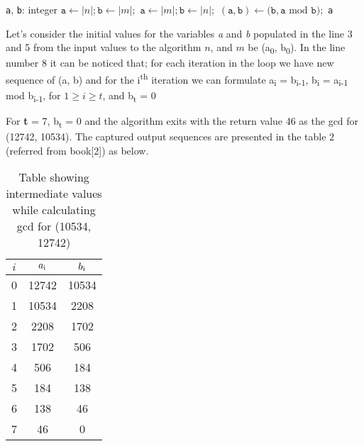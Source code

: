 \documentclass[conference,compsoc]{IEEEtran}
\newcommand{\var}[1]{\textit{#1}}
\newcommand{\progvar}[1]{\texttt{#1}}
\renewcommand{\mod}{\text{mod}}
\begin{document}

\begin{algorithmic}[1]
\STATE \progvar{a}, \progvar{b}: integer
	\STATE $\progvar{a} \gets |n|; \progvar{b} \gets |m|;$
\ELSE
	\STATE $\progvar{a} \gets |m|; \progvar{b} \gets |n|;$
\ENDIF
\WHILE{$\progvar{b} > 0$ } 
	\STATE $(\progvar{a}, \progvar{b}) \leftarrow (\progvar{b}, \progvar{a}  $ $\mod $ $\progvar{b});$
\ENDWHILE
\RETURN \progvar{a}
\end {algorithmic}

Let's consider the initial values for the variables \var{a} and \var{b} populated in the line 3 and 5 from the input values to the algorithm $n$, and $m$ be (a\textsubscript{0}, b\textsubscript{0}). In the line number 8 it can be noticed that; for each iteration in the loop we have new sequence of (a, b) and for the i\textsuperscript{th} iteration we can formulate a\textsubscript{i} = b\textsubscript{i-1}, b\textsubscript{i} = a\textsubscript{i-1} mod b\textsubscript{i-1}, for $1 \geq i \geq t$, and b\textsubscript{t} = 0

For \textbf{t} = 7, b\textsubscript{t} = 0 and the algorithm exits with the return value 
46 as the gcd for (12742, 10534). The captured output sequences are presented in the table 2 (referred from book[2]) as below.
\begin{table}[!htbp]
\caption{Table showing intermediate values while calculating gcd for (10534, 12742)}
\label{table_org_book_example}
\centering
	\begin{tabular}{c | c | c}
		\hline
		$i$ & $a\textsubscript{i}$ & $b\textsubscript{i}$ \\ [0.5ex] 
		\hline
		0 & 12742 & 10534 \\ 
		1 & 10534 & 2208 \\  
		2 & 2208  & 1702 \\
		3 & 1702  & 506 \\
		4 & 506   & 184 \\
		5 & 184   & 138 \\
		6 & 138   & 46 \\
		7 & 46    & 0
	\end{tabular}
\end{table}
\end{document}
